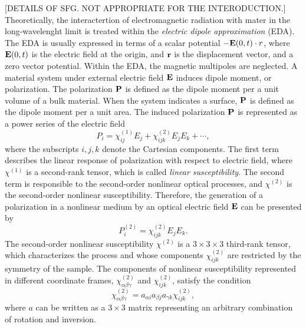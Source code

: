[DETAILS OF SFG. NOT APPROPRIATE FOR THE INTERODUCTION.]
Theoretically, the interactertion of electromagnetic radiation with mater in the long-wavelenght limit is treated within the \emph{electric dipole approximation} (EDA). 
The EDA is usually expressed in terms of a scalar potential $-{\bf E}(0,t)\cdot r$, where ${\bf E}(0,t)$ is the electric field at the origin, and $\bf r$ is the displacement vector, and a zero vector potential\cite{Kobe1982}. 
Within the EDA, the magnetic multipoles are neglected.
A material system under external electric field $\bf E$ induces dipole moment, or
polarization. The polarization $\bf P$ is defined as the dipole moment per
a unit volume of a bulk material. 
When the system indicates a surface, $\bf P$ is defined as the dipole moment per a unit area. 
The induced polarization $\bf P$ is represented as a power series of the electric field\cite{Morita2018}
\begin{equation}
{P}_{i} =\chi^{(1)}_{ij}E_j + \chi^{(2)}_{ijk}E_{j}E_{k} + \cdots,
\label{eq:polarization_1}
\end{equation}
where the subscripts $i,j,k$ denote the Cartesian components. 
The first term describes the linear response of polarization with respect 
to electric field, where $\chi^{(1)}$ is a second-rank tensor, which is called \emph{linear susceptibility}. 
The second term is responsible to the second-order nonlinear optical processes, and $\chi^{(2)}$ is the second-order nonlinear susceptibility.
Therefore, the generation of a polarization in a nonlinear medium by an optical electric field ${\bf E}$ can be presented by
\begin{equation}
{P}^{(2)}_{i} =\chi^{(2)}_{ijk}E_{j}E_{k}.
\label{eq:polarization_1}
\end{equation}
The second-order nonlinear susceptibility $\chi^{(2)}$ is a $3 \times 3 \times 3$ third-rank tensor, which characterizes the process and whose components $\chi^{(2)}_{ijk}$ are 
restricted by the symmetry of the sample.
The components of nonlinear susceptibility represented in different coordinate frames, $\chi^{(2)}_{\alpha\beta\gamma}$ and $\chi^{(2)}_{ijk}$, satisfy the condition 
\begin{equation}
\chi^{(2)}_{\alpha\beta\gamma} = a_{\alpha i}a_{\beta j}a_{\gamma k}\chi^{(2)}_{ijk},
\label{eq:tensor_chi}
\end{equation}
where $a$ can be written as a $3 \times 3$ matrix representing an arbitrary combination of rotation and inversion.
